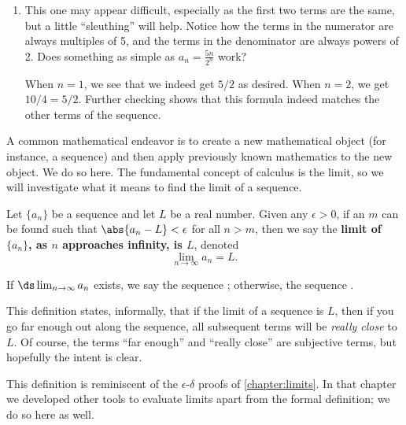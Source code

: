 \begin{example}
\begin{enumerate}
\item		This one may appear difficult, especially as the first two terms are the same, but a little ``sleuthing'' will help. Notice how the terms in the numerator are always multiples of 5, and the terms in the denominator are always powers of 2. Does something as simple as $a_n = \frac{5n}{2^n}$ work?

When $n=1$, we see that we indeed get $5/2$ as desired. When $n=2$, we get $10/4 = 5/2$. Further checking shows that this formula indeed matches the other terms of the sequence.
\end{enumerate}
\end{example}

A common mathematical endeavor is to create a new mathematical object (for instance, a sequence) and then apply previously known mathematics to the new object. We do so here. The fundamental concept of calculus is the limit, so we will investigate what it means to find the limit of a sequence.

\begin{definition}\label{def:seq_limit}
Let $\{a_n\}$ be a sequence and let $L$ be a real number. Given any $\epsilon>0$, if an $m$ can be found such that $\abs{a_n-L}<\epsilon$ for all $n>m$, then we say the \textbf{limit of $\{a_n\}$, as $n$ approaches infinity, is $L$}, denoted \[\lim_{n\to\infty}a_n = L.\]

If $\ds\lim_{n\to\infty} a_n$ exists, we say the sequence ; otherwise, the sequence .
\end{definition}

This definition states, informally, that if the limit of a sequence is $L$, then if you go far enough out along the sequence, all subsequent terms will be \emph{really close} to $L$. Of course, the terms ``far enough'' and ``really close'' are subjective terms, but hopefully the intent is clear.

This definition is reminiscent of the $\epsilon$-$\delta$ proofs of \autoref{chapter:limits}. In that chapter we developed other tools to evaluate limits apart from the formal definition; we do so here as well.

